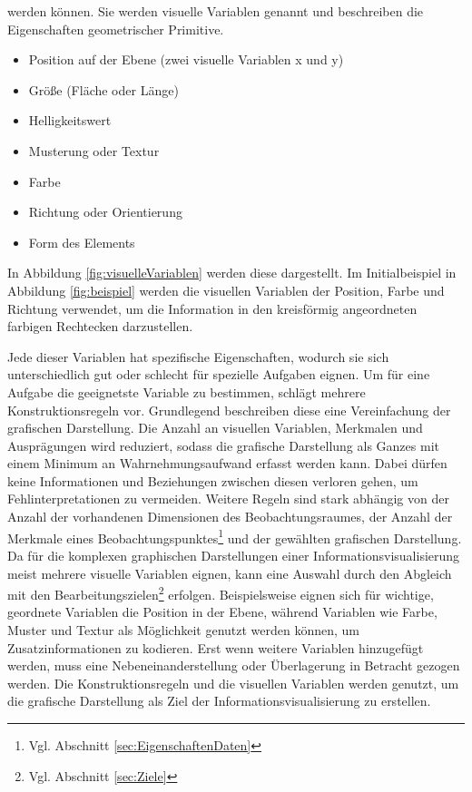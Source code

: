 \documentclass[a4paper, 
               12pt,
               DIV=calc,
               version=first,
               pdftex,
               headsepline,
               footsepline,
               bibtotocnumbered,
               liststotocnumbered]{scrreprt}
\begin{document}
werden können. Sie werden visuelle Variablen genannt und beschreiben die Eigenschaften geometrischer Primitive.
\begin{itemize}
\item Position auf der Ebene (zwei visuelle Variablen x und y)
\item Größe (Fläche oder Länge)
\item Helligkeitswert
\item Musterung oder Textur
\item Farbe
\item Richtung oder Orientierung
\item Form des Elements
\end{itemize}
In Abbildung \ref{fig:visuelleVariablen} werden diese dargestellt. Im Initialbeispiel in Abbildung
\ref{fig:beispiel} werden die visuellen Variablen der Position, Farbe und Richtung verwendet,
um die Information in den kreisförmig angeordneten farbigen Rechtecken darzustellen.

Jede dieser Variablen hat spezifische Eigenschaften, wodurch sie sich unterschiedlich gut oder schlecht
für spezielle Aufgaben eignen. Um für eine Aufgabe die geeignetste Variable zu bestimmen, schlägt
\cite{Bertin} mehrere Konstruktionsregeln vor.
Grundlegend beschreiben diese eine Vereinfachung der grafischen Darstellung.
Die Anzahl an visuellen Variablen, Merkmalen und Ausprägungen wird reduziert,
sodass die grafische Darstellung als Ganzes mit einem Minimum an Wahrnehmungsaufwand erfasst werden kann.
Dabei dürfen keine Informationen und Beziehungen zwischen diesen verloren gehen, um Fehlinterpretationen
zu vermeiden. Weitere Regeln sind stark abhängig von der Anzahl
der vorhandenen Dimensionen des Beobachtungsraumes, der Anzahl der Merkmale eines
Beobachtungspunktes\footnote{Vgl. Abschnitt \ref{sec:EigenschaftenDaten}} und der gewählten
grafischen Darstellung. Da für die komplexen graphischen Darstellungen einer 
Informationsvisualisierung meist mehrere visuelle Variablen eignen, kann eine Auswahl
durch den Abgleich mit den Bearbeitungszielen\footnote{Vgl. Abschnitt \ref{sec:Ziele}} erfolgen.
Beispielsweise eignen sich für wichtige, geordnete Variablen die Position in der Ebene,
während Variablen wie Farbe, Muster und Textur als Möglichkeit genutzt werden können, um Zusatzinformationen zu kodieren.
Erst wenn weitere Variablen hinzugefügt werden, muss eine Nebeneinanderstellung oder
Überlagerung in Betracht gezogen werden.
Die Konstruktionsregeln und die visuellen Variablen werden genutzt, um
die grafische Darstellung als Ziel der Informationsvisualisierung zu erstellen.
\end{document}
